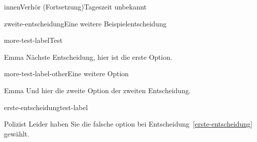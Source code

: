 \documentclass[12pt]{article}
\begin{document}
\begin{scene}{innen}{Verhör (Fortsetzung)}{Tageszeit unbekannt}
        \begin{decision}{zweite-entscheidung}{Eine weitere Beispielentscheidung}
            \begin{option}{more-test-label}{Test}
                \begin{dialog}{Emma}
                    Nächste Entscheidung, hier ist die erste Option.
                \end{dialog}
            \end{option}
            \begin{option}{more-test-label-other}{Eine weitere Option}
                \begin{dialog}{Emma}
                    Und hier die zweite Option der zweiten Entscheidung.
                \end{dialog}
            \end{option}
        \end{decision}

        \begin{conditional}{erste-entscheidung}{test-label}
            \begin{dialog}{Polizist}
                Leider haben Sie die falsche option bei Entscheidung~\ref{erste-entscheidung} gewählt.
            \end{dialog}
        \end{conditional}

    \end{scene}
\end{document}
